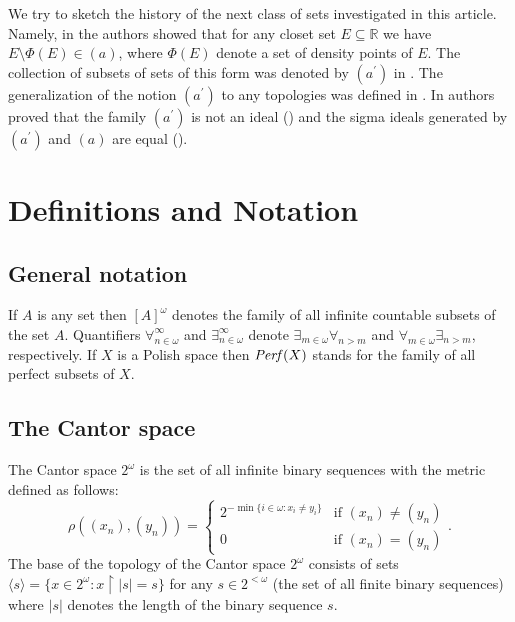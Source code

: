 \documentclass[12pt]{amsart}
\theoremstyle{plain}
\theoremstyle{definition}
\theoremstyle{remark}
\newcommand{\Perf}{{\it Perf}}
\newcommand{\real}{\mathbb{R}}
\newcommand{\aideal}{\mathit{(a)}}
\newcommand{\aidealprime}{\mathit{(a^\prime)}}
\newcommand{\ninomega}{n\in\omega}
\begin{document}
  We try to sketch the history of the next class of sets investigated
in this article. Namely, in \cite{GS}
the authors showed that for any closet set $E\subseteq \real$ we have
$E\setminus \Phi(E) \in (a)$, where $\Phi(E)$ denote a set of
density points of $E$. The collection of subsets of sets of this form was
denoted by $\aidealprime$ in \cite[Section 4]{FG}. The generalization of the notion $\aidealprime$ to any topologies was defined in \cite{N}. 
In \cite{FG} authors proved that the family $\aidealprime$
is not an ideal (\cite[Proposition 6]{FG}) and the sigma ideals generated by 
$\aidealprime$ and $\aideal$ are equal (\cite[Theorem 12]{FG}).

\section{Definitions and Notation}
\subsection{General notation}
If $A$ is any set then
$[A]^\omega$ denotes the
family of all infinite countable
subsets of the set $A$.
Quantifiers $\forall^\infty_{\ninomega}$ and $\exists^\infty_{\ninomega}$ denote 
$\exists_{m\in\omega} \forall_{n > m}$ and $\forall_{m\in\omega} \exists_{n > m}$,
respectively.
If $X$ is a Polish space then $\Perf(X)$ 
stands for the family of all perfect subsets of $X$.

\subsection{The Cantor space}
The Cantor space $2^\omega$ is the set of all infinite binary sequences with the metric 
defined as follows: 
\[\rho((x_n), (y_n)) = \begin{cases}
     2^{-\min\lbrace i \in \omega\colon x_i \not= y_i\rbrace} & \text{if }(x_n) \not= (y_n)\\
     0      & \text{if }(x_n) = (y_n)
\end{cases}.\]
The base of the topology of the Cantor space $2^\omega$ consists of sets 
$\langle s \rangle = \lbrace x \in 2^\omega\colon x \restriction |s| = s\rbrace$ for any $s\in 2^{<\omega}$ (the set of all finite binary sequences) where $|s|$ denotes
the length of the binary sequence $s$.
\end{document}

